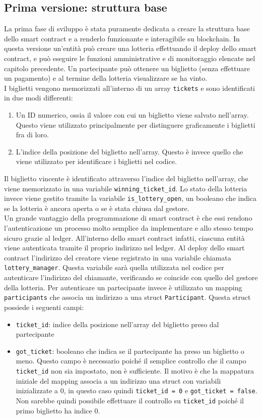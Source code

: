 \documentclass[12pt,a4paper,openright,twoside]{report}
\begin{document}
\subsection{Prima versione: struttura base}
La prima fase di sviluppo è stata puramente dedicata a creare la struttura base dello smart contract e a renderlo funzionante e interagibile su blockchain. In questa versione un'entità può creare una lotteria effettuando il deploy dello smart contract, e può eseguire le funzioni amministrative e di monitoraggio elencate nel capitolo precedente. Un partecipante può ottenere un biglietto (senza effettuare un pagamento) e al termine della lotteria visualizzare se ha vinto.\\
I biglietti vengono memorizzati all'interno di un array \texttt{tickets} e sono identificati in due modi differenti:
\begin{enumerate}
    \item Un ID numerico, ossia il valore con cui un biglietto viene salvato nell'array. Questo viene utilizzato principalmente per distinguere graficamente i biglietti fra di loro.
    \item L'indice della posizione del biglietto nell'array. Questo è invece quello che viene utilizzato per identificare i biglietti nel codice. 
\end{enumerate}
Il biglietto vincente è identificato attraverso l'indice del biglietto nell'array, che viene memorizzato in una variabile \texttt{winning\_ticket\_id}. Lo stato della lotteria invece viene gestito tramite la variabile \texttt{is\_lottery\_open}, un booleano che indica se la lotteria è ancora aperta o se è stata chiusa dal gestore.\\
Un grande vantaggio della programmazione di smart contract è che essi rendono l'autenticazione un processo molto semplice da implementare e allo stesso tempo sicuro grazie al ledger. All'interno dello smart contract infatti, ciascuna entità viene autenticata tramite il proprio indirizzo nel ledger. Al deploy dello smart contract l'indirizzo del creatore viene registrato in una variabile chiamata \texttt{lottery\_manager}. Questa variabile sarà quella utilizzata nel codice per autenticare l'indirizzo del chiamante, verificando se coincide con quello del gestore della lotteria. Per autenticare un partecipante invece è utilizzato un mapping \texttt{participants} che associa un indirizzo a una struct \texttt{Participant}. Questa struct possiede i seguenti campi:
\begin{itemize}
    \item \texttt{ticket\_id}: indice della posizione nell'array del biglietto preso dal partecipante
    \item \texttt{got\_ticket}: booleano che indica se il partecipante ha preso un biglietto o meno. Questo campo è necessario poiché il semplice controllo che il campo \texttt{ticket\_id} non sia impostato, non è sufficiente. Il motivo è che la mappatura iniziale del mapping associa a un indirizzo una struct con variabili inizializzate a 0, in questo caso quindi \texttt{ticket\_id = 0} e \texttt{got\_ticket = false}. Non sarebbe quindi possibile effettuare il controllo su \texttt{ticket\_id} poiché il primo biglietto ha indice 0.
\end{itemize}
\end{document}
